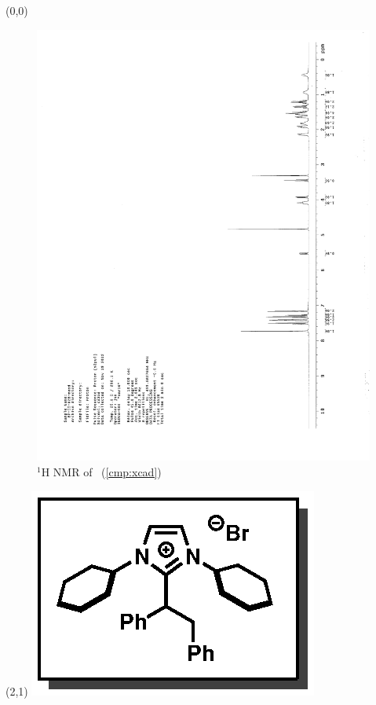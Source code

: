 \begin{textblock}{20}(0,0)
\begin{figure}[htb]
\caption{$^1$H NMR of \CMPxcad\ (\ref{cmp:xcad})}
\includegraphics[scale=0.75, trim = 0mm 0mm 0mm 5mm,
clip]{chp_alkylation/images/nmr/xcadH}
\vspace{-100pt}
\end{figure}
\end{textblock}
\begin{textblock}{1}(2,1)
\includegraphics[scale=0.8, angle=90]{chp_alkylation/images/xcad}
\end{textblock}

